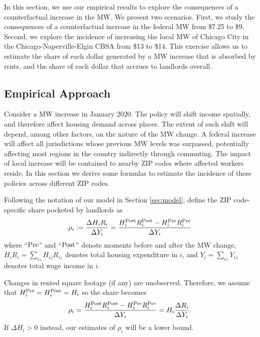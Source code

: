 
In this section, we use our empirical results to explore the consequences of 
a counterfactual increase in the MW. 
We present two scenarios.
First, we study the consequences of a counterfactual increase in the federal MW
from \$7.25 to \$9.
Second, we explore the incidence of increasing the local MW of Chicago City in 
the Chicago-Naperville-Elgin CBSA from \$13 to \$14.
This exercise allows us to estimate the share of each dollar generated by a MW 
increase that is absorbed by rents, and the share of each dollar that accrues to
landlords overall.


\subsection{Empirical Approach}\label{sec:emp_cf}

Consider a MW increase in January 2020.
The policy will shift income spatially, and therefore affect housing demand
across places.
The extent of such shift will depend, among other factors, on the nature of the 
MW change.
A federal increase will affect all jurisdictions whose previous MW levels was 
surpassed, potentially affecting most regions in the country indirectly 
through commuting.
The impact of local increase will be contained to nearby ZIP codes where 
affected workers reside.
In this section we derive some formulas to estimate the incidence of these 
policies across different ZIP codes.

Following the notation of our model in Section \ref{sec:model}, define the 
ZIP code-specific share pocketed by landlords as
\begin{equation*}
    \rho_i := \frac{\Delta H_i R_i}{\Delta Y_i} 
            = \frac{H^{\text{Post}}_i R^{\text{Post}}_i - H^{\text{Pre}}_i R^{\text{Pre}}_i}{\Delta Y_i} 
\end{equation*}
where
``$\text{Pre}$'' and ``$\text{Post}$'' denote moments before and after the MW change,
$H_i R_i = \sum_{iz} H_{iz} R_{iz}$ denotes total housing expenditure in $i$, and
$Y_i = \sum_{iz} Y_{iz}$ denotes total wage income in $i$.

Changes in rented square footage (if any) are unobserved.
Therefore, we assume that
$H^{\text{Pre}}_i = H^{\text{Post}}_i = H_i$ 
so the share becomes
\begin{equation}\label{eq:share_pocketed}
    \rho_i = \frac{H^{\text{Post}}_i R^{\text{Post}}_i - H^{\text{Pre}}_i R^{\text{Pre}}_i}{\Delta Y_i} = 
                H_i \frac{\Delta R_i}{\Delta Y_i} .
\end{equation}
If $\Delta H_i > 0$ instead, our estimates of $\rho_i$ will be a lower bound.


